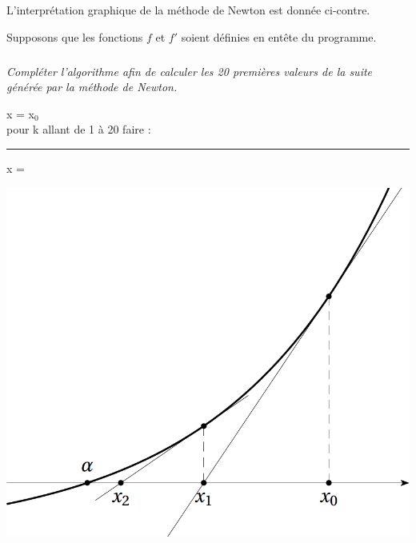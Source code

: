 \documentclass[10pt,oneside]{article}
\begin{document}
\begin{minipage}[c]{.57\linewidth}
L'interprétation graphique de la méthode de Newton est donnée ci-contre.

Supposons que les fonctions $f$ et $f'$ soient définies en entête du programme.

\subparagraph{}\textit{Compléter l'algorithme afin de calculer les 20 premières valeurs de la suite générée par la méthode de Newton.}

\begin{pseudo}

\ttfamily

\rule{0pt}{1.5em}
x = x$_0$\\
pour k allant de 1 à 20 faire :\\
\rule{1cm}{0pt} x =
\end{pseudo}


\end{minipage} \hfill
\begin{minipage}[c]{.4\linewidth}
\begin{center}
\includegraphics[width=\textwidth]{images/fig1}
\end{center}
\end{minipage}
\end{document}
